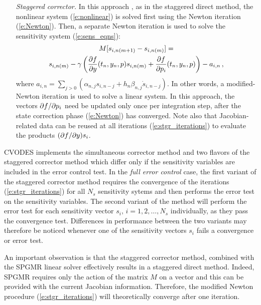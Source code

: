 \begin{itemize}
\item[{\em Staggered corrector.}] In this approach \cite{FTB:97}, as in the staggered direct method,
  the nonlinear system (\ref{e:nonlinear}) is solved first using the Newton iteration
  (\ref{e:Newton}). Then, a separate Newton iteration is used to solve the
  sensitivity system (\ref{e:sens_eqns}):
  \begin{multline}\label{e:stgr_iterations}
    M [s_{i , n(m+1)} - s_{i , n(m)}]= \\
    s_{i, n(m)} - 
    \gamma \left( \frac{\partial f}{\partial y} (t_n , y_n, p) s_{i , n(m)} + \frac{\partial f}{\partial p_i} (t_n , y_n , p) \right)
    -a_{i,n} \, ,
  \end{multline}
  where $a_{i,n} = \sum_{j>0}(\alpha_{n,j}s_{i , n-j}+h_n\beta_{n,j}\dot{s}_{i , n-j})$.
  In other words, a modified-Newton iteration is used to solve a linear system.
  In this approach, the vectors $\partial f / \partial p_i$ need be updated only once per integration step, 
  after the state correction phase (\ref{e:Newton}) has converged. Note also that 
  Jacobian-related data can be reused at all iterations (\ref{e:stgr_iterations})
  to evaluate the products $(\partial f / \partial y) s_i$.
\end{itemize}  

CVODES implements the simultaneous corrector method and two flavors of the 
staggered corrector method which differ only if the sensitivity variables are
included in the error control test.
In the {\em full error control} case, 
the first variant of the staggered corrector method requires the convergence of 
the iterations (\ref{e:stgr_iterations}) for all $N_s$ sensitivity sytems and then 
performs the error test on the sensitivity variables. The second variant of the method
will perform the error test for each sensitivity vector $s_i,\,i=1,2,\ldots,N_s$
individually, as they pass the convergence test. Differences in performance
between the two variants may therefore be noticed whenever one of the sensitivity 
vectors $s_i$ fails a convergence or error test. 

An important observation is that the staggered corrector method, combined with 
the SPGMR linear solver effectively results in a staggered direct method. 
Indeed, SPGMR requires only the action of the matrix $M$ on a vector and
this can be provided with the current Jacobian information. Therefore, the
modified Newton procedure (\ref{e:stgr_iterations}) will theoretically converge 
after one iteration.

